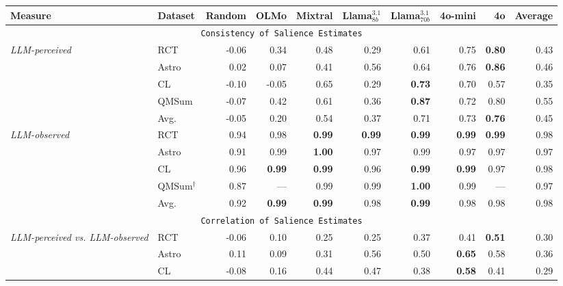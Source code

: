 \begin{table*}[t]
\small
\centering
\setlength{\tabcolsep}{4pt}
\begin{tabular}{llrrrrrrrr}
\toprule
\textbf{Measure} & \textbf{Dataset} & \bfseries Random & \bfseries OLMo & \bfseries Mixtral & \bfseries Llama$^{3.1}_{8b}$ & \bfseries Llama$^{3.1}_{70b}$ & \bfseries 4o-mini & \bfseries 4o & \bfseries Average \\
\midrule
\multicolumn{10}{c}{\texttt{Consistency of Salience Estimates}}\\\midrule
\multirow[c]{5}{0.14\textwidth}{\emph{LLM-perceived}} & RCT & -0.06 & 0.34 & 0.48 & 0.29 & 0.61 & 0.75 & \bfseries 0.80 & 0.43 \\
\bfseries  & Astro & 0.02 & 0.07 & 0.41 & 0.56 & 0.64 & 0.76 & \bfseries 0.86 & 0.46 \\
\bfseries  & CL & -0.10 & -0.05 & 0.65 & 0.29 & \bfseries 0.73 & 0.70 & 0.57 & 0.35 \\
\bfseries  & QMSum & -0.07 & 0.42 & 0.61 & 0.36 & \bfseries 0.87 & 0.72 & 0.80 & 0.55 \\\cmidrule{2-10}
\bfseries  & Avg. & -0.05 & 0.20 & 0.54 & 0.37 & 0.71 & 0.73 & \bfseries 0.76 & 0.45 \\\midrule
\multirow[c]{5}{0.14\textwidth}{\emph{LLM-observed}} & RCT & 0.94 & 0.98 & \bfseries 0.99 & \bfseries 0.99 & \bfseries 0.99 & \bfseries 0.99 & \bfseries 0.99 & 0.98 \\
\bfseries  & Astro & 0.91 & 0.99 & \bfseries 1.00 & 0.97 & 0.99 & 0.97 & 0.97 & 0.97 \\
\bfseries  & CL & 0.96 & \bfseries 0.99 & \bfseries 0.99 & 0.96 & \bfseries 0.99 & \bfseries 0.99 & 0.97 & 0.98 \\
\bfseries  & QMSum$^\dagger$ & 0.87 & --- & 0.99 & 0.99 & \bfseries 1.00 & 0.99 & --- & 0.97 \\\cmidrule{2-10}
\bfseries  & Avg. & 0.92 & \bfseries 0.99 & \bfseries 0.99 & 0.98 & \bfseries 0.99 & 0.98 & 0.98 & 0.98 \\\midrule
\multicolumn{10}{c}{\texttt{Correlation of Salience Estimates}} \\\midrule
\multirow[c]{5}{0.14\textwidth}{\emph{LLM-perceived vs. LLM-observed}} & RCT & -0.06 & 0.10 & 0.25 & 0.25 & 0.37 & 0.41 & \bfseries 0.51 & 0.30 \\
\bfseries  & Astro & 0.11 & 0.09 & 0.31 & 0.56 & 0.50 & \bfseries 0.65 & 0.58 & 0.36 \\
\bfseries  & CL & -0.08 & 0.16 & 0.44 & 0.47 & 0.38 & \bfseries 0.58 & 0.41 & 0.29 \\

\end{tabular}
\end{table*}
